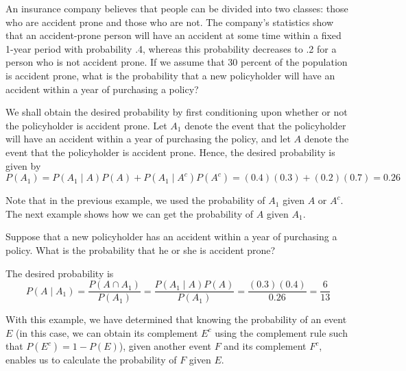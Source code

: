         \begin{example}
        	An insurance company believes that people can be divided into two classes: those who are accident prone and those who are not. The company's statistics show that an accident-prone person will have an accident at some time within a fixed 1-year period with probability .4, whereas this probability decreases to .2 for a person who is not accident prone. If we assume that 30 percent of the population is accident prone, what is the probability that a new policyholder will have an accident within a year of purchasing a policy?
        	
        	\begin{solution}
        		We shall obtain the desired probability by first conditioning upon whether or not the policyholder is accident prone. Let \(A_1\) denote the event that the policyholder will have an accident within a year of purchasing the policy, and let \(A\) denote the event that the policyholder is accident prone. Hence, the desired probability is given by
        		\[
        		P(A_1) = P(A_1 \mid A)P(A) + P(A_1 \mid A^c)P(A^c) = (0.4)(0.3) + (0.2)(0.7) = 0.26
        		\]
        	\end{solution}
        \end{example}
        Note that in the previous example, we used the probability of $A_1$ given $A$ or $A^c$. The next example shows how we can get the probability of $A$ given $A_1$. 
        \begin{example}
        	Suppose that a new policyholder has an accident within a year of purchasing a policy. What is the probability that he or she is accident prone?
        	
        	\begin{solution}
        		The desired probability is
        		\[
        		P(A \mid A_1) = \frac{P(A \cap A_1)}{P(A_1)} = \frac{P(A_1 \mid A)P(A)}{P(A_1)} = \frac{(0.3)(0.4)}{0.26} = \frac{6}{13}
        		\]
        	\end{solution}
        \end{example}
        
       With this example, we have determined that knowing the probability of an event $E$ (in this case, we can obtain its complement $E^c$ using the complement rule such that $P(E^c) = 1 - P(E)$), given another event $F$ and its complement $F^c$, enables us to calculate the probability of $F$ given $E$.
       
